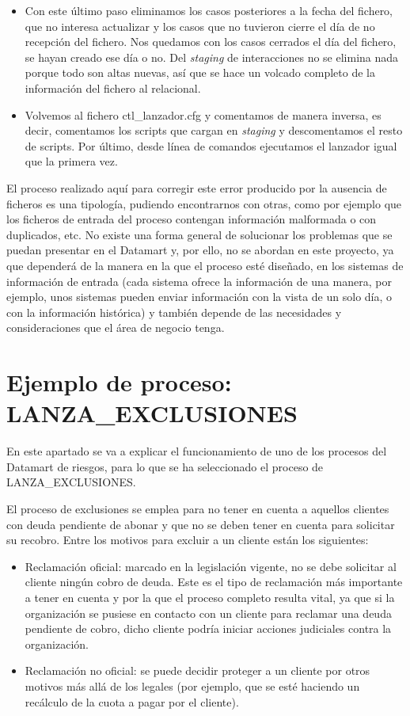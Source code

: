 \documentclass[a4paper, 12pt]{book}
\begin{document}
\begin{enumerate}
\begin{itemize}
	\item Con este último paso eliminamos los casos posteriores a la fecha del fichero, que no interesa actualizar y los casos que no tuvieron cierre el día de no recepción del fichero. Nos quedamos con los casos cerrados el día del fichero, se hayan creado ese día o no. Del \textit{staging} de interacciones no se elimina nada porque todo son altas nuevas, así que se hace un volcado completo de la información del fichero al relacional.
	
	\item Volvemos al fichero ctl\_lanzador.cfg y comentamos de manera inversa, es decir, comentamos los scripts que cargan en \textit{staging} y descomentamos el resto de scripts. Por último, desde línea de comandos ejecutamos el lanzador igual que la primera vez.
\end{itemize}
El proceso realizado aquí para corregir este error producido por la ausencia de ficheros es una tipología, pudiendo encontrarnos con otras, como por ejemplo que los ficheros de entrada del proceso contengan información malformada o con duplicados, etc. No existe una forma general de solucionar los problemas que se puedan presentar en el Datamart y, por ello, no se abordan en este proyecto, ya que dependerá de la manera en la que el proceso esté diseñado, en los sistemas de información de entrada (cada sistema ofrece la información de una manera, por ejemplo, unos sistemas pueden enviar información con la vista de un solo día, o con la información histórica) y también depende de las necesidades y consideraciones que el área de negocio tenga. 
\end{enumerate}

\section{Ejemplo de proceso: LANZA\_EXCLUSIONES} 
\label{sec:lanza_exclusiones}
En este apartado se va a explicar el funcionamiento de uno de los procesos del Datamart de riesgos, para lo que se ha seleccionado el proceso de LANZA\_EXCLUSIONES.

El proceso de exclusiones se emplea para no tener en cuenta a aquellos clientes con deuda pendiente de abonar y que no se deben tener en cuenta para solicitar su recobro. Entre los motivos para excluir a un cliente están los siguientes:

\begin{itemize}
	\item Reclamación oficial: marcado en la legislación vigente, no se debe solicitar al cliente ningún cobro de deuda. Este es el tipo de reclamación más importante a tener en cuenta y por la que el proceso completo resulta vital, ya que si la organización se pusiese en contacto con un cliente para reclamar una deuda pendiente de cobro, dicho cliente podría iniciar acciones judiciales contra la organización.
	
	\item Reclamación no oficial: se puede decidir proteger a un cliente por otros motivos más allá de los legales (por ejemplo, que se esté haciendo un recálculo de la cuota a pagar por el cliente).
\end{itemize}
\end{document}
